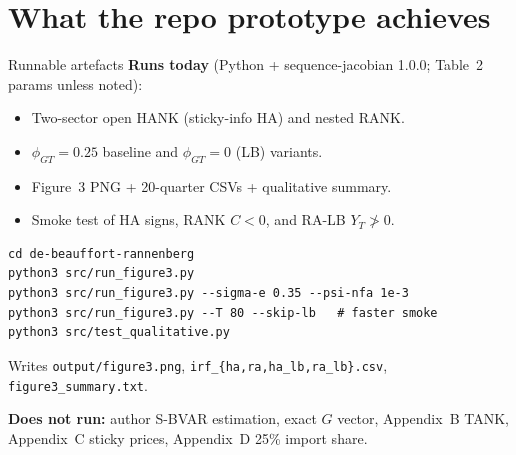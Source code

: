 \documentclass[11pt,aspectratio=169]{beamer}
\begin{document}
\section{What the repo prototype achieves}
\begin{frame}[fragile]{Runnable artefacts}
  \textbf{Runs today} (Python + sequence-jacobian 1.0.0; Table~2 params unless noted):
  \begin{itemize}
    \item Two-sector open HANK (sticky-info HA) and nested RANK.
    \item $\phi_{GT}=0.25$ baseline and $\phi_{GT}=0$ (LB) variants.
    \item Figure~3 PNG + 20-quarter CSVs + qualitative summary.
    \item Smoke test of HA signs, RANK $C<0$, and RA-LB $Y_T\not>0$.
  \end{itemize}
  {\scriptsize
  \begin{verbatim}
cd de-beauffort-rannenberg
python3 src/run_figure3.py
python3 src/run_figure3.py --sigma-e 0.35 --psi-nfa 1e-3
python3 src/run_figure3.py --T 80 --skip-lb   # faster smoke
python3 src/test_qualitative.py
  \end{verbatim}
  }
  Writes \texttt{output/figure3.png}, \texttt{irf\_\{ha,ra,ha\_lb,ra\_lb\}.csv},
  \texttt{figure3\_summary.txt}.

  \textbf{Does not run:} author S-BVAR estimation, exact $G$ vector,
  Appendix~B TANK, Appendix~C sticky prices, Appendix~D 25\% import share.
\end{frame}
\end{document}
